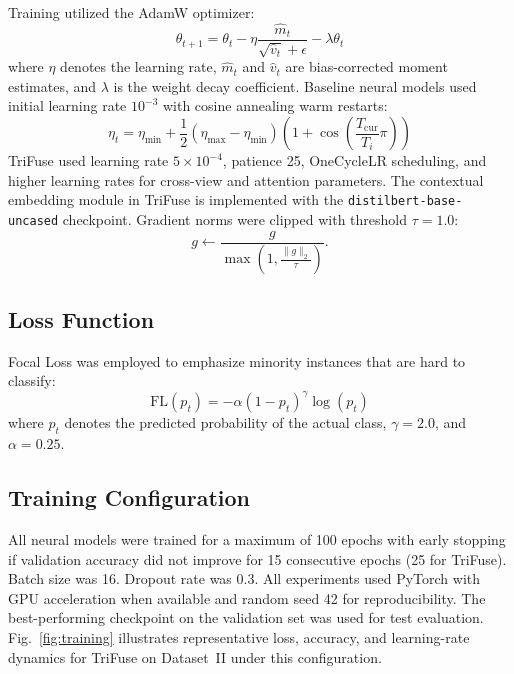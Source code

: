Training utilized the AdamW optimizer:
\begin{equation}
\theta_{t+1} = \theta_t - \eta \frac{\hat{m}_t}{\sqrt{\hat{v}_t} + \epsilon} - \lambda \theta_t
\end{equation}
where $\eta$ denotes the learning rate, $\hat{m}_t$ and $\hat{v}_t$ are bias-corrected moment estimates, and $\lambda$ is the weight decay coefficient. Baseline neural models used initial learning rate $10^{-3}$ with cosine annealing warm restarts:
\begin{equation}
\eta_t = \eta_{\min} + \frac{1}{2}(\eta_{\max} - \eta_{\min}) \left(1 + \cos\left(\frac{T_{\mathrm{cur}}}{T_i}\pi\right)\right)
\end{equation}
TriFuse used learning rate $5 \times 10^{-4}$, patience 25, OneCycleLR scheduling, and higher learning rates for cross-view and attention parameters. The contextual embedding module in TriFuse is implemented with the \texttt{distilbert-base-uncased} checkpoint. Gradient norms were clipped with threshold $\tau = 1.0$:
\[
g \leftarrow \frac{g}{\max\left(1, \frac{\|g\|_2}{\tau}\right)}.
\]

\subsection{Loss Function}

Focal Loss was employed to emphasize minority instances that are hard to classify:
\begin{equation}
\mathrm{FL}(p_t) = -\alpha (1 - p_t)^\gamma \log(p_t)
\end{equation}
where $p_t$ denotes the predicted probability of the actual class, $\gamma = 2.0$, and $\alpha = 0.25$.

\subsection{Training Configuration}

All neural models were trained for a maximum of 100 epochs with early stopping if validation accuracy did not improve for 15 consecutive epochs (25 for TriFuse). Batch size was 16. Dropout rate was 0.3. All experiments used PyTorch with GPU acceleration when available and random seed 42 for reproducibility. The best-performing checkpoint on the validation set was used for test evaluation. Fig.~\ref{fig:training} illustrates representative loss, accuracy, and learning-rate dynamics for TriFuse on Dataset~II under this configuration.

